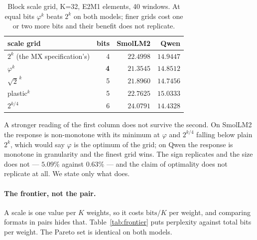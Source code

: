 \documentclass[11pt]{article}
\theoremstyle{definition}
\begin{document}
\begin{table}[t]\centering
\caption{Block scale grid, K=32, E2M1 elements, 40 windows. At equal bits
$\varphi^{k}$ beats $2^{k}$ on both models; finer grids cost one or two more
bits and their benefit does not replicate.}
\label{tab:scalegrid}
\begin{tabular}{lrrr}
\toprule
scale grid & bits & SmolLM2 & Qwen \\
\midrule
$2^{k}$ (the MX specification's) & 4 & $22.4998$ & $14.9447$ \\
$\varphi^{k}$                    & \textbf{4} & $\mathbf{21.3545}$ & $\mathbf{14.8512}$ \\
$\sqrt{2}^{\,k}$                 & 5 & $21.8960$ & $14.7456$ \\
plastic$^{k}$                    & 5 & $22.7625$ & $15.0333$ \\
$2^{k/4}$                        & 6 & $24.0791$ & $14.4328$ \\
\bottomrule
\end{tabular}
\end{table}

A stronger reading of the first column does not survive the second. On SmolLM2
the response is non-monotone with its minimum at $\varphi$ and $2^{k/4}$ falling
below plain $2^{k}$, which would say $\varphi$ is the optimum of the grid; on
Qwen the response is monotone in granularity and the finest grid wins. The sign
replicates and the size does not --- $5.09\%$ against $0.63\%$ --- and the claim
of optimality does not replicate at all. We state only what does.

\paragraph{The frontier, not the pair.} A scale is one value per $K$ weights,
so it costs $\mathrm{bits}/K$ per weight, and comparing formats in pairs hides
that. Table~\ref{tab:frontier} puts perplexity against total bits per weight.
The Pareto set is identical on both models.
\end{document}
